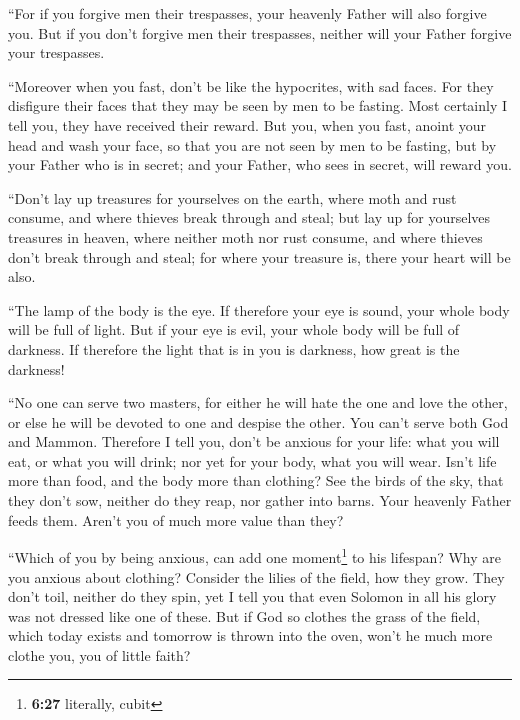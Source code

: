  ``For if you forgive men their trespasses, your heavenly
Father will also forgive you.  But if you don't forgive
men their trespasses, neither will your Father forgive your trespasses.

 ``Moreover when you fast, don't be like the hypocrites,
with sad faces. For they disfigure their faces that they may be seen by
men to be fasting. Most certainly I tell you, they have received their
reward.  But you, when you fast, anoint your head and
wash your face,  so that you are not seen by men to be
fasting, but by your Father who is in secret; and your Father, who sees
in secret, will reward you.

 ``Don't lay up treasures for yourselves on the earth,
where moth and rust consume, and where thieves break through and steal;
 but lay up for yourselves treasures in heaven, where
neither moth nor rust consume, and where thieves don't break through and
steal;  for where your treasure is, there your heart will
be also.

 ``The lamp of the body is the eye. If therefore your eye
is sound, your whole body will be full of light.  But if
your eye is evil, your whole body will be full of darkness. If therefore
the light that is in you is darkness, how great is the darkness!

 ``No one can serve two masters, for either he will hate
the one and love the other, or else he will be devoted to one and
despise the other. You can't serve both God and Mammon. 
Therefore I tell you, don't be anxious for your life: what you will eat,
or what you will drink; nor yet for your body, what you will wear. Isn't
life more than food, and the body more than clothing? 
See the birds of the sky, that they don't sow, neither do they reap, nor
gather into barns. Your heavenly Father feeds them. Aren't you of much
more value than they?

 ``Which of you by being anxious, can add one
moment\footnote{\textbf{6:27} literally, cubit} to his lifespan?
 Why are you anxious about clothing? Consider the lilies
of the field, how they grow. They don't toil, neither do they spin,
 yet I tell you that even Solomon in all his glory was
not dressed like one of these.  But if God so clothes the
grass of the field, which today exists and tomorrow is thrown into the
oven, won't he much more clothe you, you of little faith?

